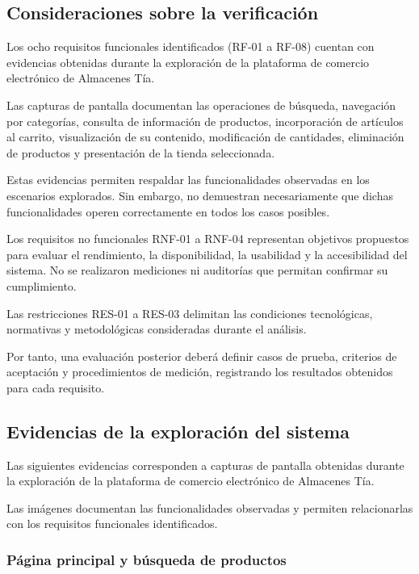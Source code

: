 \documentclass[12pt,a4paper]{article}
\begin{document}
\subsection{Consideraciones sobre la verificación}


Los ocho requisitos funcionales identificados
(RF-01 a RF-08) cuentan con evidencias obtenidas
durante la exploración de la plataforma de
comercio electrónico de Almacenes Tía.

Las capturas de pantalla documentan las
operaciones de búsqueda, navegación por
categorías, consulta de información de
productos, incorporación de artículos al
carrito, visualización de su contenido,
modificación de cantidades, eliminación
de productos y presentación de la tienda
seleccionada.

Estas evidencias permiten respaldar las
funcionalidades observadas en los escenarios
explorados. Sin embargo, no demuestran
necesariamente que dichas funcionalidades
operen correctamente en todos los casos
posibles.

Los requisitos no funcionales RNF-01 a RNF-04
representan objetivos propuestos para evaluar
el rendimiento, la disponibilidad, la
usabilidad y la accesibilidad del sistema.
No se realizaron mediciones ni auditorías
que permitan confirmar su cumplimiento.

Las restricciones RES-01 a RES-03 delimitan
las condiciones tecnológicas, normativas
y metodológicas consideradas durante
el análisis.

Por tanto, una evaluación posterior deberá
definir casos de prueba, criterios de
aceptación y procedimientos de medición,
registrando los resultados obtenidos
para cada requisito.



\subsection{Evidencias de la exploración del sistema}

Las siguientes evidencias corresponden a capturas
de pantalla obtenidas durante la exploración de
la plataforma de comercio electrónico de
Almacenes Tía.

Las imágenes documentan las funcionalidades
observadas y permiten relacionarlas con los
requisitos funcionales identificados.

\subsubsection{Página principal y búsqueda de productos}
\end{document}
